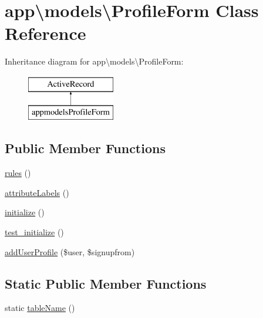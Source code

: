 \hypertarget{classapp_1_1models_1_1ProfileForm}{}\section{app\textbackslash{}models\textbackslash{}Profile\+Form Class Reference}
\label{classapp_1_1models_1_1ProfileForm}
Inheritance diagram for app\textbackslash{}models\textbackslash{}Profile\+Form\+:\begin{figure}[H]
\begin{center}
\leavevmode
\includegraphics[height=2.000000cm]{classapp_1_1models_1_1ProfileForm}
\end{center}
\end{figure}
\subsection*{Public Member Functions}
\begin{DoxyCompactItemize}
\item 
\hyperlink{classapp_1_1models_1_1ProfileForm_ae6a8f3dd460d3ff4377f62f234be6ee9}{rules} ()
\item 
\hyperlink{classapp_1_1models_1_1ProfileForm_a685a2817afeedb9d103743959ad975ca}{attribute\+Labels} ()
\item 
\hyperlink{classapp_1_1models_1_1ProfileForm_ae7b0dbbff0b01febacd6025337f72dfc}{initialize} ()
\item 
\hyperlink{classapp_1_1models_1_1ProfileForm_a781f53269dc3f3974932497284d10a7e}{test\+\_\+initialize} ()
\item 
\hyperlink{classapp_1_1models_1_1ProfileForm_a63d6177515a6a73f568ca0a9360ab1fb}{add\+User\+Profile} (\$user, \$signupfrom)
\end{DoxyCompactItemize}
\subsection*{Static Public Member Functions}
\begin{DoxyCompactItemize}
\item 
static \hyperlink{classapp_1_1models_1_1ProfileForm_aeef44bfb431e7410e7c57000e6790032}{table\+Name} ()
\end{DoxyCompactItemize}


